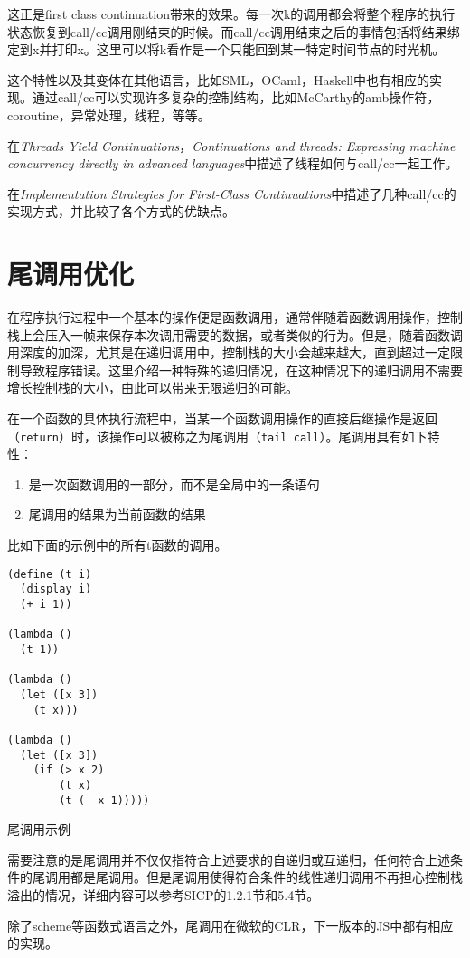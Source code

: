 这正是first class continuation带来的效果。每一次k的调用都会将整个程序的执行状态恢复到call/cc调用刚结束的时候。而call/cc调用结束之后的事情包括将结果绑定到x并打印x。这里可以将k看作是一个只能回到某一特定时间节点的时光机。

这个特性以及其变体在其他语言，比如SML，OCaml，Haskell中也有相应的实现。通过call/cc可以实现许多复杂的控制结构，比如McCarthy的amb操作符\cite{mccarthy61}，coroutine，异常处理，线程，等等。

在\textit{Threads Yield Continuations\cite{kumar1998threads}}，\textit{Continuations and threads: Expressing machine concurrency directly in advanced languages\cite{shivers1997continuations}}中描述了线程如何与call/cc一起工作。

在\textit{Implementation Strategies for First-Class Continuations\cite{clinger1999implementation}}中描述了几种call/cc的实现方式，并比较了各个方式的优缺点。

\section{尾调用优化}

在程序执行过程中一个基本的操作便是函数调用，通常伴随着函数调用操作，控制栈上会压入一帧来保存本次调用需要的数据，或者类似的行为。但是，随着函数调用深度的加深，尤其是在递归调用中，控制栈的大小会越来越大，直到超过一定限制导致程序错误。这里介绍一种特殊的递归情况，在这种情况下的递归调用不需要增长控制栈的大小，由此可以带来无限递归的可能。

在一个函数的具体执行流程中，当某一个函数调用操作的直接后继操作是返回（\texttt{return}）时，该操作可以被称之为尾调用（\texttt{tail call}）。尾调用具有如下特性：

\begin{enumerate}[1.]
\item 是一次函数调用的一部分，而不是全局中的一条语句
\item 尾调用的结果为当前函数的结果
\end{enumerate}

比如下面的示例中的所有t函数的调用。

\begin{code}
\begin{verbatim}
(define (t i)
  (display i)
  (+ i 1))

(lambda ()
  (t 1))

(lambda ()
  (let ([x 3])
    (t x)))

(lambda ()
  (let ([x 3])
    (if (> x 2)
        (t x)
        (t (- x 1)))))
\end{verbatim}
\caption{尾调用示例}
\end{code}

需要注意的是尾调用并不仅仅指符合上述要求的自递归或互递归，任何符合上述条件的尾调用都是尾调用。但是尾调用使得符合条件的线性递归调用不再担心控制栈溢出的情况，详细内容可以参考SICP\cite{sicp}的1.2.1节和5.4节。

除了scheme等函数式语言之外，尾调用在微软的CLR，下一版本的JS中都有相应的实现。